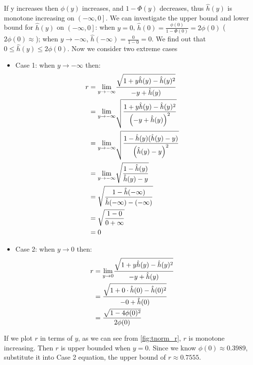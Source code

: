 If y increases then $\phi(y)$ increases, and $1 - \Phi(y)$ decreases, thus $\hat{h}(y)$ is monotone increasing on $ \left(-\infty, 0 \right]$. We can investigate the upper bound and lower bound for  $\hat{h}(y)$ on $\left(-\infty, 0 \right]$: when $y= 0$, $\hat{h}(0) =  \frac{\phi(0)}{1 - \Phi(0)} = 2\phi(0)$ ($2\phi(0) \approx $); when $y \to -\infty$, $\hat{h}(-\infty) =  \frac{0}{1 - 0} = 0$. We find out that $0 \leqslant \hat{h}(y) \leqslant 2\phi(0)$. Now we consider two extreme cases
\begin{itemize}
	\item Case 1: when $y \to -\infty$ then: \\ 
	\begin{equation}\notag
		\begin{split}
			r &=  \displaystyle{\lim_{y \to -\infty}}\frac{ \sqrt{1+y\hat{h}(y) -\hat{h}(y)^2}}{ -y + \hat{h}(y)} \\&= \displaystyle{\lim_{y \to -\infty}}\sqrt{\frac{ 1+y\hat{h}(y) -\hat{h}(y)^2}{\left(-y + \hat{h}(y)\right)^2}} \\&=  \displaystyle{\lim_{y \to -\infty}}\sqrt{\frac{ 1-\hat{h}(y)(\hat{h}(y)-y)}{\left(\hat{h}(y)-y \right)^2}}
			\\&= \displaystyle{\lim_{y \to -\infty}}\sqrt{\frac{ 1-\hat{h}(y)}{\hat{h}(y)-y }}\\&= \sqrt{\frac{ 1-\hat{h}(-\infty)}{\hat{h}(-\infty)-(-\infty) }}\\&= \sqrt{\frac{ 1-0}{0+ \infty}}\\&=0
		\end{split}
	\end{equation} 
	\item Case 2:  when $y \to 0$ then: \\ 
	\begin{equation}\notag
		\begin{split}
			r &=   \displaystyle{\lim_{y \to 0}}\frac{ \sqrt{1+y\hat{h}(y) -\hat{h}(y)^2}}{ -y + \hat{h}(y)} \\&= 
			\frac{ \sqrt{1+0\cdot \hat{h}(0) -\hat{h}(0)^2}}{ -0 + \hat{h}(0)} \\&= 
			\frac{ \sqrt{1-4\phi(0)^2}}{2\phi(0)} 
		\end{split}
	\end{equation} 
\end{itemize}
If we plot $r$ in terms of $y$, as we can see from \cref{fig:tnorm_r}, $r$ is monotone increasing. Then $r$ is upper bounded when $y = 0$. Since we know $\phi(0) \approx 0.3989$, substitute it into Case 2 equation, the upper bound of $r \approx 0.7555$.

